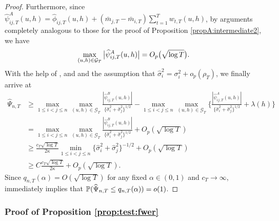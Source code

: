 \documentclass[a4paper,12pt]{article}
\makeatletter
\renewcommand{\eqref}[1]{\tagform@{\ref{#1}}}
\makeatother
\begin{document}
\begin{proof}
Furthermore, since $\widehat\psi_{ij,T}^A(u, h) = \widehat\phi_{ij,T}(u, h) + (\bar{m}_{j, T} - \bar{m}_{i, T}) \sum_{t=1}^T w_{t, T}(u, h)$, by arguments completely analogous to those for the proof of Proposition \ref{propA:intermediate2}, we have
\begin{align}\label{eqA:power:psiA}
\max_{(u, h) \in \mathcal{G}_T} \big|\widehat\psi_{ij,T}^A(u, h)\big|  = O_p\big(\sqrt{\log T}\big).
\end{align}
With the help of \eqref{eqA:power:psiB}, \eqref{eqA:power:psiA} and \eqref{eqA:power:lambda} and the assumption that $\widehat{\sigma}^2_i = \sigma^2_i + o_p(\rho_T)$, we finally arrive at 
{\color{black}
\begin{align}
\widehat{\Psi}_{n, T}  & \ge \max_{1 \le i < j \le n} \max_{(u,h) \in \mathcal{G}_T} \frac{|\widehat{\psi}_{ij, T}^B(u,h)|}{\{\widehat{\sigma}_i^2 + \widehat{\sigma}_j^2\}^{1/2}} - \max_{1 \le i < j \le n} \max_{(u,h) \in \mathcal{G}_T} \bigg\{ \frac{|\widehat{\psi}_{ij, T}^A(u,h)|}{\{\widehat{\sigma}^2_i + \widehat{\sigma}_j^2\}^{1/2}} + \lambda(h) \bigg\} \nonumber \\
 & = \max_{1 \le i < j \le n} \max_{(u,h) \in \mathcal{G}_T} \frac{|\widehat{\psi}_{ij, T}^B(u,h)|}{\{\widehat{\sigma}_i^2 + \widehat{\sigma}_j^2\}^{1/2}} + O_p(\sqrt{\log T}) \nonumber \\
 & \ge \frac{c_T \sqrt{\log T}}{2 \kappa} \min_{1 \le i < j \le n}\{\widehat{\sigma}_i^2 + \widehat{\sigma}_j^2\}^{-1/2} + O_p(\sqrt{\log T})\nonumber \\
  & \ge C\frac{c_T \sqrt{\log T}}{2 \kappa} + O_p(\sqrt{\log T}). \label{eq5-proof-prop-test-power}
\end{align}}
Since $q_{n, T}(\alpha) = O(\sqrt{\log T})$ for any fixed $\alpha \in (0,1)$ and $c_T \to \infty$, \eqref{eq5-proof-prop-test-power} immediately implies that $\mathbb{P}(\widehat{\Psi}_{n, T} \le q_{n, T}(\alpha)) = o(1)$. 
\end{proof}

\subsubsection*{Proof of Proposition \ref{prop:test:fwer}}\label{subsec:app:fwer}
\end{document}
